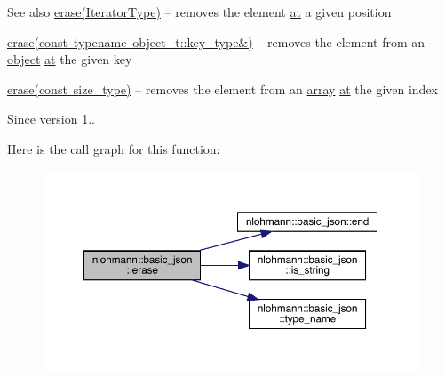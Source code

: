 \begin{DoxySeeAlso}{See also}
\mbox{\hyperlink{classnlohmann_1_1basic__json_a068a16e76be178e83da6a192916923ed}{erase(\+Iterator\+Type)}} -- removes the element \mbox{\hyperlink{classnlohmann_1_1basic__json_a73ae333487310e3302135189ce8ff5d8}{at}} a given position 

\mbox{\hyperlink{classnlohmann_1_1basic__json_a2f8484d69c55d8f2a9697a7bec29362a}{erase(const typename object\+\_\+t\+::key\+\_\+type\&)}} -- removes the element from an \mbox{\hyperlink{classnlohmann_1_1basic__json_a9f42ee7d10eee2d5a73fd94ca7f767ca}{object}} \mbox{\hyperlink{classnlohmann_1_1basic__json_a73ae333487310e3302135189ce8ff5d8}{at}} the given key 

\mbox{\hyperlink{classnlohmann_1_1basic__json_a88cbcefe9a3f4d294bed0653550a5cb9}{erase(const size\+\_\+type)}} -- removes the element from an \mbox{\hyperlink{classnlohmann_1_1basic__json_a4a4ec75e4d2845d9bcf7a9e5458e4949}{array}} \mbox{\hyperlink{classnlohmann_1_1basic__json_a73ae333487310e3302135189ce8ff5d8}{at}} the given index
\end{DoxySeeAlso}
\begin{DoxySince}{Since}
version 1.. 
\end{DoxySince}
Here is the call graph for this function\+:
\nopagebreak
\begin{figure}[H]
\begin{center}
\leavevmode
\includegraphics[width=350pt]{classnlohmann_1_1basic__json_a4b3f7eb2d4625d95a51fbbdceb7c5f39_cgraph}
\end{center}
\end{figure}
\mbox{\label{classnlohmann_1_1basic__json_a2f8484d69c55d8f2a9697a7bec29362a}} 
